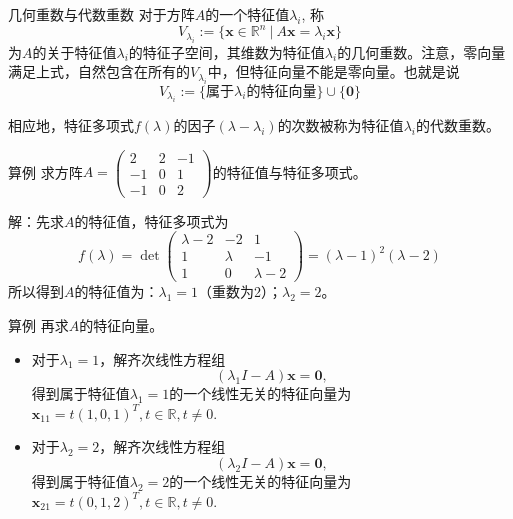 \begin{frame}

\begin{block}{几何重数与代数重数}
对于方阵$A$的一个特征值$\lambda_i$, 称
\[V_{\lambda_i} := \{ \mathbf{x} \in \mathbb{R}^n \ |\ A\mathbf{x} = \lambda_i\mathbf{x} \}\]
为$A$的关于特征值$\lambda_i$的特征子空间，其维数为特征值$\lambda_i$的几何重数。注意，零向量满足上式，自然包含在所有的$V_{\lambda_i}$中，但特征向量不能是零向量。也就是说
\[V_{\lambda_i} := \{ \text{属于$\lambda_i$的特征向量} \} \cup \{\mathbf{0}\}\]

\vspace{1em}
\pause

相应地，特征多项式$f(\lambda)$的因子$(\lambda - \lambda_i)$的次数被称为特征值$\lambda_i$的代数重数。
\end{block}

\end{frame}


\begin{frame}

\begin{block}{算例}
求方阵$A = \begin{pmatrix} 2 & 2 & -1 \\ -1 & 0 & 1 \\ -1 & 0 & 2 \end{pmatrix}$的特征值与特征多项式。

\vspace{1em}
\pause

解：先求$A$的特征值，特征多项式为
\[
f(\lambda) = \det \begin{pmatrix} \lambda-2 & -2 & 1 \\ 1 & \lambda & -1 \\ 1 & 0 & \lambda-2 \end{pmatrix} = (\lambda-1)^2(\lambda-2)
\]
所以得到$A$的特征值为：$\lambda_1=1$（重数为2）；$\lambda_2=2$。
\end{block}

\end{frame}


\begin{frame}

\begin{block}{算例}
再求$A$的特征向量。

\begin{itemize}
\item 对于$\lambda_1 = 1$，解齐次线性方程组
\[(\lambda_1 I-A)\mathbf{x} = \mathbf{0},\]
得到属于特征值$\lambda_1 = 1$的一个线性无关的特征向量为$\mathbf{x}_{11} = t(1,0,1)^T, t\in\mathbb{R}, t\neq 0$.
\item 对于$\lambda_2 = 2$，解齐次线性方程组
\[(\lambda_2 I-A)\mathbf{x} = \mathbf{0},\]
得到属于特征值$\lambda_2 = 2$的一个线性无关的特征向量为$\mathbf{x}_{21} = t(0,1,2)^T, t\in\mathbb{R}, t\neq 0$.
\end{itemize}
\end{block}

\end{frame}

